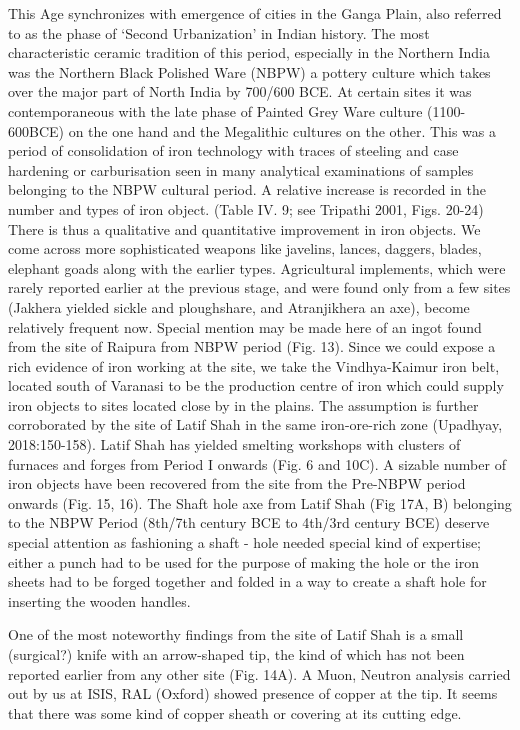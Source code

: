 This Age synchronizes with emergence of cities in the Ganga Plain, also referred to as the phase of ‘Second Urbanization’ in Indian history. The most characteristic ceramic tradition of this period, especially in the Northern India was the Northern Black Polished Ware (NBPW) a pottery culture which takes over the major part of North India by 700/600 BCE. At certain sites it was contemporaneous with the late phase of Painted Grey Ware culture (1100-600BCE) on the one hand and the Megalithic cultures on the other. This was a period of consolidation of iron technology with traces of steeling and case hardening or carburisation seen in many analytical examinations of samples belonging to the NBPW cultural period. A relative increase is recorded in the number and types of iron object. (Table IV. 9; see Tripathi 2001, Figs. 20-24) There is thus a qualitative and quantitative improvement in iron objects. We come across more sophisticated weapons like javelins, lances, daggers, blades, elephant goads along with the earlier types. Agricultural implements, which were rarely reported earlier at the previous stage, and were found only from a few sites (Jakhera yielded sickle and ploughshare, and Atranjikhera an axe), become relatively frequent now. Special mention may be made here of an ingot found from the site of Raipura from NBPW period (Fig. 13). Since we could expose a rich evidence of iron working at the site, we take the Vindhya-Kaimur iron belt, located south of Varanasi to be the production centre of iron which could supply iron objects to sites located close by in the plains. The assumption is further corroborated by the site of Latif Shah in the same iron-ore-rich zone (Upadhyay, 2018:150-158). Latif Shah has yielded smelting workshops with clusters of furnaces and forges from Period I onwards (Fig. 6 and 10C). A sizable number of iron objects have been recovered from the site from the Pre-NBPW period onwards (Fig. 15, 16). The Shaft hole axe from Latif Shah (Fig 17A, B) belonging to the NBPW Period (8th/7th century BCE to 4th/3rd century BCE) deserve special attention as fashioning a shaft - hole needed special kind of expertise; either a punch had to be used for the purpose of making the hole or the iron sheets had to be forged together and folded in a way to create a shaft hole for inserting the wooden handles.

One of the most noteworthy findings from the site of Latif Shah is a small (surgical?) knife with an arrow-shaped tip, the kind of which has not been reported earlier from any other site (Fig. 14A). A Muon, Neutron analysis carried out by us at ISIS, RAL (Oxford) showed presence of copper at the tip. It seems that there was some kind of copper sheath or covering at its cutting edge.

